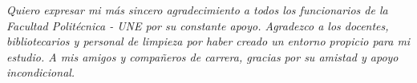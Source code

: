 \thispagestyle{empty}
\null\vfill

{\large \textit{Quiero expresar mi más sincero agradecimiento a todos los funcionarios de la Facultad Politécnica - UNE por su constante apoyo.
Agradezco a los docentes, bibliotecarios y personal de limpieza por haber creado un entorno propicio para mi estudio.
A mis amigos y compañeros de carrera, gracias por su amistad y apoyo incondicional.
}}


